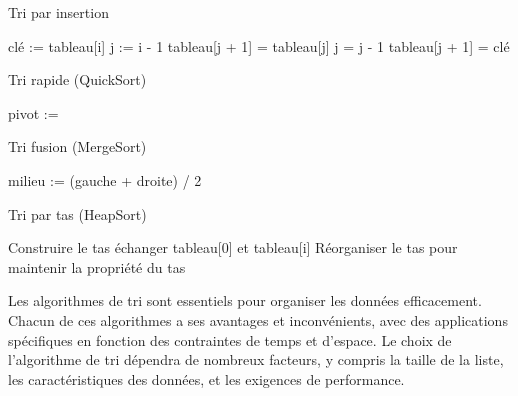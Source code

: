\begin{algorithm}
	\caption{Tri par insertion}
	\begin{algorithmic}[1]
		\State clé := tableau[i]
		\State j := i - 1
		\State tableau[j + 1] = tableau[j]
		\State j = j - 1
		\EndWhile
		\State tableau[j + 1] = clé
		\EndFor
	\end{algorithmic}
\end{algorithm}

\begin{algorithm}
	\caption{Tri rapide (QuickSort)}
	\begin{algorithmic}[1]
		\State pivot := 
		\State {}
		\State {}
		\EndIf
		\EndFunction
	\end{algorithmic}
\end{algorithm}

\begin{algorithm}
	\caption{Tri fusion (MergeSort)}
	\begin{algorithmic}[1]
		\State milieu := (gauche + droite) / 2
		\State {}
		\State {}
		\State {}
		\EndIf
		\EndFunction
	\end{algorithmic}
\end{algorithm}

\begin{algorithm}
	\caption{Tri par tas (HeapSort)}
	\begin{algorithmic}[1]
		\State Construire le tas
		\State échanger tableau[0] et tableau[i]
		\State Réorganiser le tas pour maintenir la propriété du tas
		\EndFor
		\EndFunction
	\end{algorithmic}
\end{algorithm}

		Les algorithmes de tri sont essentiels pour organiser les données efficacement. Chacun de ces algorithmes a ses avantages et inconvénients, avec des applications spécifiques en fonction des contraintes de temps et d'espace. Le choix de l'algorithme de tri dépendra de nombreux facteurs, y compris la taille de la liste, les caractéristiques des données, et les exigences de performance. 
		
